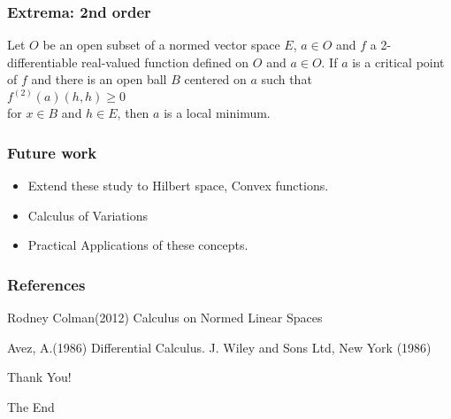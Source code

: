 \documentclass{beamer}
\begin{document}
\begin{frame}
\frametitle{Extrema: 2nd order}

Let $O$ be an open subset of a normed vector space $E$, $a \in O$ and $f$ a 2-differentiable real-valued function defined on $O$ and $a \in O$. If $a$ is a critical point of $f$ and there is an open ball $B$ centered on $a$ such that\\
\hspace*{3cm} $f^{(2)}(a)(h,h) \geq 0$\\
for $x \in B$ and $h \in E$, then $a$ is a local minimum.\\


\end{frame}
\begin{frame}
\frametitle{Future work}
\begin{itemize}
\item Extend these study to Hilbert space, Convex functions.

\item Calculus of Variations

\item Practical Applications of these concepts.

\end{itemize}

\end{frame}
%
\begin{frame}
\frametitle{References}
\footnotesize{
\begin{thebibliography}{99} %
 Rodney Colman(2012)
\newblock Calculus on Normed Linear Spaces

 Avez, A.(1986)
\newblock  Differential Calculus. J. Wiley and Sons Ltd, New York (1986)
\end{thebibliography}
}
\end{frame}




\begin{frame}
\Large{\centerline{Thank You!}}
\small{\centerline{The End}}
\end{frame}

\end{document}
